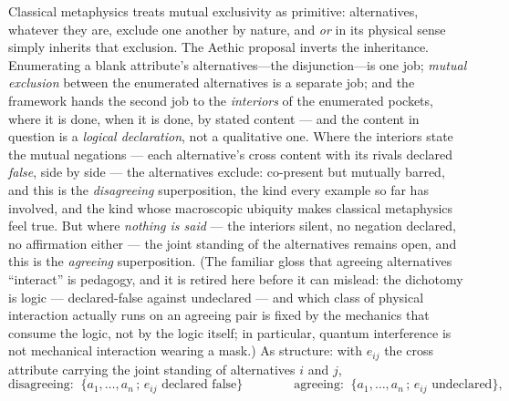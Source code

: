 \documentclass[11pt]{article}
\theoremstyle{definition}
\begin{document}
Classical metaphysics treats mutual exclusivity as primitive: alternatives, whatever they are, exclude one another by nature, and \emph{or} in its physical sense simply inherits that exclusion. The Aethic proposal inverts the inheritance. Enumerating a blank attribute's alternatives---the disjunction---is one job; \emph{mutual exclusion} between the enumerated alternatives is a separate job; and the framework hands the second job to the \emph{interiors} of the enumerated pockets, where it is done, when it is done, by stated content --- and the content in question is a \emph{logical declaration}, not a qualitative one. Where the interiors state the mutual negations --- each alternative's cross content with its rivals declared \emph{false}, side by side --- the alternatives exclude: co-present but mutually barred, and this is the \emph{disagreeing} superposition, the kind every example so far has involved, and the kind whose macroscopic ubiquity makes classical metaphysics feel true. But where \emph{nothing is said} --- the interiors silent, no negation declared, no affirmation either --- the joint standing of the alternatives remains open, and this is the \emph{agreeing} superposition. (The familiar gloss that agreeing alternatives ``interact'' is pedagogy, and it is retired here before it can mislead: the dichotomy is logic --- declared-false against undeclared --- and which class of physical interaction actually runs on an agreeing pair is fixed by the mechanics that consume the logic, not by the logic itself; in particular, quantum interference is not mechanical interaction wearing a mask.) As structure: with $e_{ij}$ the cross attribute carrying the joint standing of alternatives $i$ and $j$,
\begin{equation*}
\text{disagreeing:}\;\; \{a_1, \dots, a_n \,;\, e_{ij} \text{ declared false}\} \qquad\qquad \text{agreeing:}\;\; \{a_1, \dots, a_n \,;\, e_{ij} \text{ undeclared}\},
\end{equation*}
\end{document}
